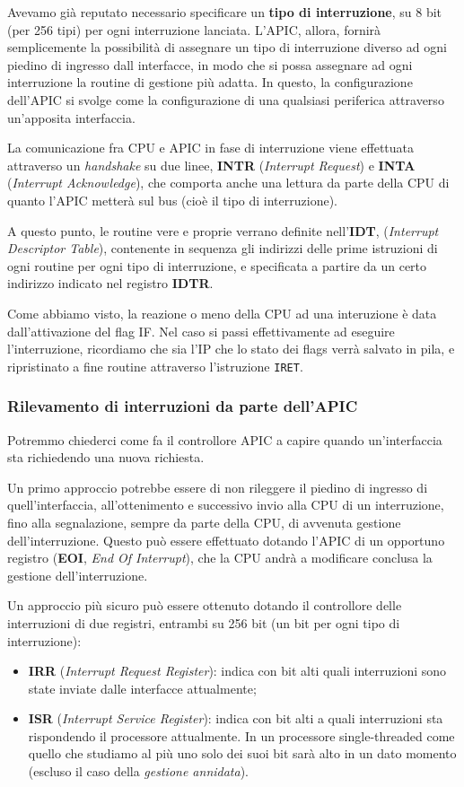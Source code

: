 \documentclass[a4paper,11pt]{article}
\begin{document}
Avevamo già reputato necessario specificare un \textbf{tipo di interruzione}, su 8 bit (per 256 tipi) per ogni interruzione lanciata.
L'APIC, allora, fornirà semplicemente la possibilità di assegnare un tipo di interruzione diverso ad ogni piedino di ingresso dall interfacce, in modo che si possa assegnare ad ogni interruzione la routine di gestione più adatta.
In questo, la configurazione dell'APIC si svolge come la configurazione di una qualsiasi periferica attraverso un'apposita interfaccia.

La comunicazione fra CPU e APIC in fase di interruzione viene effettuata attraverso un \textit{handshake} su due linee, \textbf{INTR} (\textit{Interrupt Request}) e \textbf{INTA} (\textit{Interrupt Acknowledge}), che comporta anche una lettura da parte della CPU di quanto l'APIC metterà sul bus (cioè il tipo di interruzione).

A questo punto, le routine vere e proprie verrano definite nell'\textbf{IDT}, (\textit{Interrupt Descriptor Table}), contenente in sequenza gli indirizzi delle prime istruzioni di ogni routine per ogni tipo di interruzione, e specificata a partire da un certo indirizzo indicato nel registro \textbf{IDTR}.

Come abbiamo visto, la reazione o meno della CPU ad una interuzione è data dall'attivazione del flag IF.
Nel caso si passi effettivamente ad eseguire l'interruzione, ricordiamo che sia l'IP che lo stato dei flags verrà salvato in pila, e ripristinato a fine routine attraverso l'istruzione \lstinline|IRET|.

\subsubsection{Rilevamento di interruzioni da parte dell'APIC}
Potremmo chiederci come fa il controllore APIC a capire quando un'interfaccia sta richiedendo una nuova richiesta.

Un primo approccio potrebbe essere di non rileggere il piedino di ingresso di quell'interfaccia, all'ottenimento e successivo invio alla CPU di un interruzione, fino alla segnalazione, sempre da parte della CPU, di avvenuta gestione dell'interruzione.
Questo può essere effettuato dotando l'APIC di un opportuno registro (\textbf{EOI}, \textit{End Of Interrupt}), che la CPU andrà a modificare conclusa la gestione dell'interruzione.

Un approccio più sicuro può essere ottenuto dotando il controllore delle interruzioni di due registri, entrambi su 256 bit (un bit per ogni tipo di interruzione):
\begin{itemize}
	\item \textbf{IRR} (\textit{Interrupt Request Register}): indica con bit alti quali interruzioni sono state inviate dalle interfacce attualmente;
	\item \textbf{ISR} (\textit{Interrupt Service Register}): indica con bit alti a quali interruzioni sta rispondendo il processore attualmente. In un processore single-threaded come quello che studiamo al più uno solo dei suoi bit sarà alto in un dato momento (escluso il caso della \textit{gestione annidata}).
\end{itemize}
\end{document}
